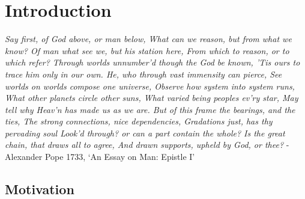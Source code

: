 
\chapter{Introduction} %
\label{Chapter:Intro}
\begin{center}
\textit{
Say first, of God above, or man below,\newline
What can we reason, but from what we know?\newline
Of man what see we, but his station here,\newline
From which to reason, or to which refer?\newline
Through worlds unnumber'd though the God be known,\newline
'Tis ours to trace him only in our own.\newline
He, who through vast immensity can pierce,\newline
See worlds on worlds compose one universe,\newline
Observe how system into system runs,\newline
What other planets circle other suns,\newline
What varied being peoples ev'ry star,\newline
May tell why Heav'n has made us as we are.\newline
But of this frame the bearings, and the ties,\newline
The strong connections, nice dependencies,\newline
Gradations just, has thy pervading soul\newline
Look'd through? or can a part contain the whole?\newline
\newline
Is the great chain, that draws all to agree,\newline
And drawn supports, upheld by God, or thee?}\newline
- Alexander Pope 1733, `An Essay on Man: Epistle I'
\end{center}

\section{Motivation}
\label{sec:Motivation}

